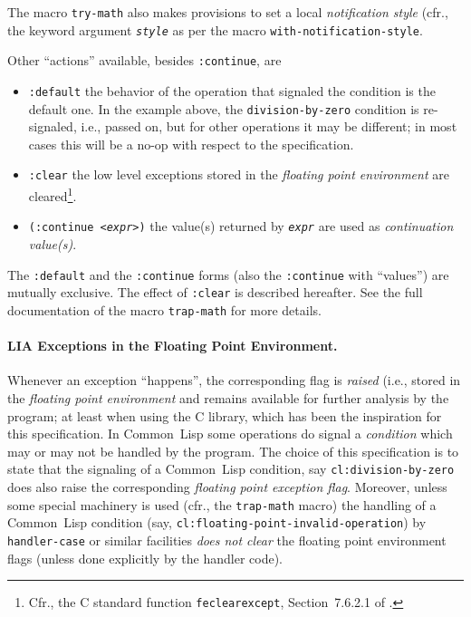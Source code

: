 \documentclass[10pt,fleqn]{article}
\newcommand{\CL}{\textsf{Common~Lisp}}
\newcommand{\CLang}{\textsf{C}}
\newcommand{\code}[1]{\texttt{#1}}
\newcommand{\clieeeterm}[1]{\textit{#1}}
\newcommand{\clterm}[1]{\textit{#1}}
\begin{document}
The macro \code{try-math} also makes provisions to set a local \emph{notification
  style} (cfr., the keyword argument \textit{\code{style}} as per the
macro \code{with-notification-style}.

Other ``actions'' available, besides \code{:continue}, are
\begin{itemize}
\item\code{:default} the behavior of the operation that signaled
  the condition is the default one. In the example above, the
  \code{division-by-zero} condition is re-signaled, i.e., passed
  on, but for other operations it may be different; in most cases this
  will be a no-op with respect to the specification.
    
\item\code{:clear} the low level exceptions stored in the
  \emph{floating point environment} are cleared\footnote{Cfr.,
    the \CLang{} standard function \code{feclearexcept},
    Section~7.6.2.1 of \cite{2018:C18}.}.

\item\code{(:continue <\textit{expr}>)} the value(s) returned by
  \code{\textit{expr}} are used as \emph{continuation value(s)}.
\end{itemize}
The \code{:default} and the \code{:continue} forms (also the
\code{:continue} with ``values'') are mutually exclusive.  The effect
of \code{:clear} is described hereafter. See the full documentation of
the macro \code{trap-math} for more details.

\paragraph{LIA Exceptions in the Floating Point Environment.} Whenever
an exception ``happens'', the corresponding flag is \emph{raised}
(i.e., stored in the \emph{floating point environment} and remains
available for further analysis by the program; at least when using the
\CLang{} library, which has been the inspiration for this
specification.  In \CL{} some operations do signal a
\clterm{condition} which may or may not be handled by the program.
The choice of this specification is to state that the signaling of a
\CL{} condition, say \code{cl:division-by-zero} does also raise the
corresponding \clieeeterm{floating point exception flag}.  Moreover,
unless some special machinery is used (cfr., the
\code{trap-math} macro) the handling of a \CL{} condition
(say, \code{cl:floating-point-invalid-operation}) by
\code{handler-case} or similar facilities \emph{does not clear} the
floating point environment flags (unless done explicitly by the
handler code).
\end{document}
